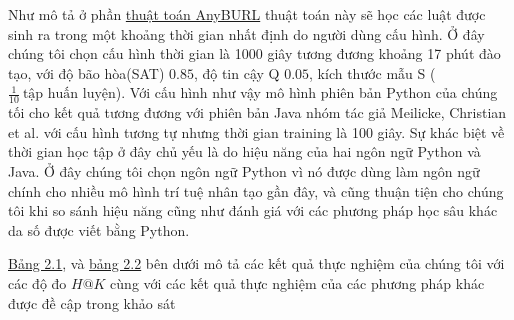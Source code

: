 Như mô tả ở phần \hyperref[algorithm2]{thuật toán AnyBURL} thuật toán này sẽ học các luật được sinh ra trong một khoảng thời gian nhất định do người dùng cấu hình. Ở đây chúng tôi chọn cấu hình thời gian là 1000 giây tương đương khoảng 17 phút đào tạo, với độ bão hòa(SAT) \(0.85\), độ tin cậy Q \(0.05\), kích thước mẫu S (\(\frac{1}{10}~ \text{tập huấn luyện}\)). Với cấu hình như vậy mô hình phiên bản Python của chúng tối cho kết quả tương đương với phiên bản Java nhóm tác giả Meilicke, Christian et al. \cite{burl} với cấu hình tương tự nhưng thời gian training là 100 giây. Sự khác biệt về thời gian học tập ở đây chủ yếu là do hiệu năng của hai ngôn ngữ Python và Java. Ở đây chúng tôi chọn ngôn ngữ Python vì nó được dùng làm ngôn ngữ chính cho nhiều mô hình trí tuệ nhân tạo gần đây, và cũng thuận tiện cho chúng tôi khi so sánh hiệu năng cũng như đánh giá với các phương pháp học sâu khác da số được viết bằng Python.

\hyperref[tab:tab1]{Bảng 2.1}, và \hyperref[tab:tab2]{bảng 2.2} bên dưới mô tả các kết quả thực nghiệm của chúng tôi với các độ đo \(H@K\) cùng với các kết quả thực nghiệm của các phương pháp khác được đề cập trong khảo  sát \cite{rossi2020knowledge}

